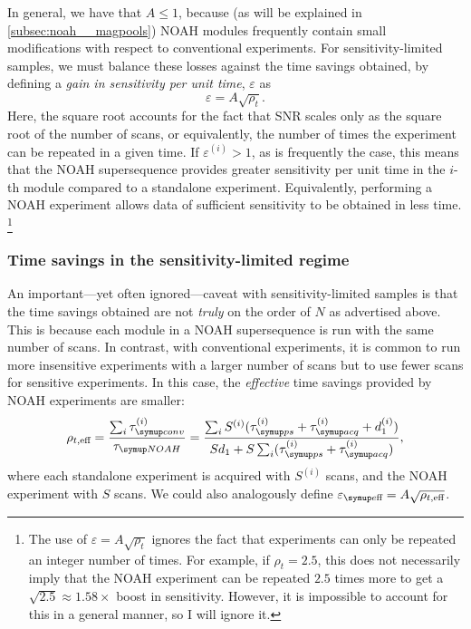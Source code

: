 In general, we have that $A \leq 1$, because (as will be explained in \cref{subsec:noah__magpools}) NOAH modules frequently contain small modifications with respect to conventional experiments.
For sensitivity-limited samples, we must balance these losses against the time savings obtained, by defining a \textit{gain in sensitivity per unit time}, $\varepsilon$ as
\begin{equation}
    \label{eq:varepsilon_i}
    \varepsilon = A \sqrt{\rho_t}.
\end{equation}
Here, the square root accounts for the fact that SNR scales only as the square root of the number of scans, or equivalently, the number of times the experiment can be repeated in a given time.
If $\varepsilon^{(i)} > 1$, as is frequently the case, this means that the NOAH supersequence provides greater sensitivity per unit time in the $i$-th module compared to a standalone experiment.
Equivalently, performing a NOAH experiment allows data of sufficient sensitivity to be obtained in less time.%
\footnote{The use of $\varepsilon = A\sqrt{\rho_t}$ ignores the fact that experiments can only be repeated an integer number of times. For example, if $\rho_t = 2.5$, this does not necessarily imply that the NOAH experiment can be repeated $2.5$ times more to get a $\sqrt{2.5} \approx 1.58{\times}$ boost in sensitivity. However, it is impossible to account for this in a general manner, so I will ignore it.}


\subsubsection{Time savings in the sensitivity-limited regime}

An important---yet often ignored---caveat with sensitivity-limited samples is that the time savings obtained are not \textit{truly} on the order of $N$ as advertised above.
This is because each module in a NOAH supersequence is run with the same number of scans.
In contrast, with conventional experiments, it is common to run more insensitive experiments with a larger number of scans but to use fewer scans for sensitive experiments.
In this case, the \textit{effective} time savings provided by NOAH experiments are smaller:
\begin{equation}
    \label{eq:rho_t_eff}
    \rhoteff
    = \frac{\sum_i \tauconv^{(i)}}{\tauNOAH}
    = \frac{{\sum_i S^{(i)}(\taups^{(i)} + \tauacq^{(i)} + d_1^{(i)})}}{Sd_1 + S\sum_i (\taups^{(i)} + \tauacq^{(i)})},
\end{equation}
where each standalone experiment is acquired with $S^{(i)}$ scans, and the NOAH experiment with $S$ scans.
We could also analogously define $\vareeff = A\sqrt{\rhoteff}$.

